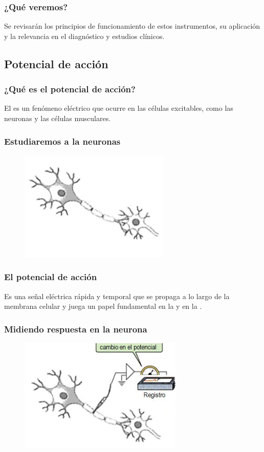 \documentclass[14pt]{beamer}
\begin{document}
\begin{frame}
\frametitle{¿Qué veremos?}
Se revisarán los principios de funcionamiento de estos instrumentos, \pause su aplicación y la relevancia en el diagnóstico y estudios clínicos.
\end{frame}

\subsection{Potencial de acción}

\begin{frame}
\frametitle{¿Qué es el potencial de acción?}
El  es un fenómeno eléctrico que ocurre en las células excitables, \pause como las neuronas y las células musculares.
\end{frame}
\begin{frame}
\frametitle{Estudiaremos a la neuronas}
\begin{figure}
    \centering
    \includegraphics[scale=1]{Imagenes/Potencial_Accion_02.png}
\end{figure}
\end{frame}
\begin{frame}
\frametitle{El potencial de acción}
Es una señal eléctrica rápida y temporal \pause que se propaga a lo largo de la membrana celular \pause y juega un papel fundamental en la  y en la .
\end{frame}
\begin{frame}
\frametitle{Midiendo respuesta en la neurona}
\begin{figure}
    \centering
    \includegraphics[scale=1]{Imagenes/Potencial_Accion_03.png}
\end{figure}
\end{frame}
\end{document}
